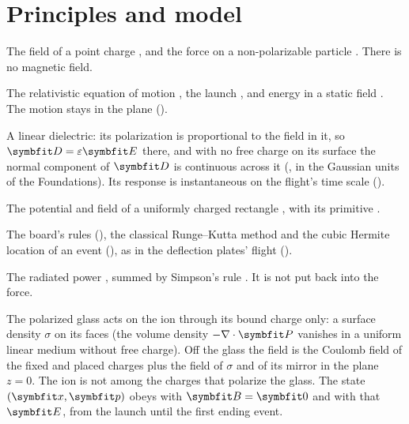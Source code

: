 \documentclass{leveldoc}
\begin{document}
\section{Principles and model}\label{sec:model}

\begin{principles}
  \item The field of a point charge , and the
    force on a non-polarizable particle .
    There is no magnetic field.
  \item The relativistic equation of motion , the
    launch , and energy in a static field
    . The motion stays in the plane
    ().
  \item A linear dielectric: its polarization is proportional to the field in
    it, so $\vect{D} = \varepsilon\vect{E}$ there, and with no free charge on
    its surface the normal component of $\vect{D}$ is continuous across it
    (, in the Gaussian units of the Foundations). Its response is
    instantaneous on the flight's time scale ().
  \item The potential and field of a uniformly charged rectangle
    , with its primitive
    .
  \item The board's rules (), the classical
    Runge--Kutta method and the cubic Hermite location of an event
    (), as in the deflection plates' flight
    ().
  \item The radiated power , summed by Simpson's
    rule . It is not put back into the force.
\end{principles}

The polarized glass acts on the ion through its bound charge only: a surface
density $\sigma$ on its faces (the volume density
$-\nabla\cdot\vect{P}$ vanishes in a uniform linear medium without free charge).
Off the glass the field is the Coulomb field of the fixed and placed charges
plus the field of $\sigma$ and of its mirror in the plane $z = 0$. The ion is
not among the charges that polarize the glass. The state $(\vect{x}, \vect{p})$
obeys  with $\vect{B} = \vect{0}$ and with that
$\vect{E}$, from the launch until the first ending event.
\end{document}
